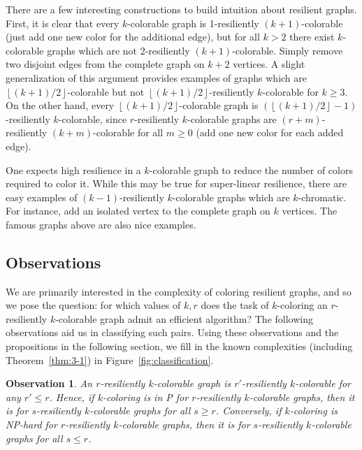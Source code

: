 \documentclass{llncs}
\newtheorem{obs}{Observation}
\begin{document}

There are a few interesting constructions to build intuition about resilient
graphs. First, it is clear that every $k$-colorable graph is 1-resiliently
$(k+1)$-colorable (just add one new color for the additional edge), but for all
$k > 2$ there exist $k$-colorable graphs which are not 2-resiliently
$(k+1)$-colorable. Simply remove two disjoint edges from the complete graph on
$k+2$ vertices. A slight generalization of this argument provides examples of
graphs which are $\left \lfloor (k+1)/2\right \rfloor$-colorable but not $\left
\lfloor (k+1)/2 \right \rfloor$-resiliently $k$-colorable for $k \geq 3$.
On the other hand, every $\left \lfloor (k+1)/2\right \rfloor$-colorable graph
is $(\left \lfloor (k+1)/2 \right \rfloor-1)$-resiliently $k$-colorable, since
$r$-resiliently $k$-colorable graphs are $(r+m)$-resiliently $(k+m)$-colorable
for all $m \geq 0$ (add one new color for each added edge). 

One expects high resilience in a $k$-colorable graph to reduce the number of
colors required to color it. While this may be true for super-linear
resilience, there are easy examples of $(k-1)$-resiliently $k$-colorable graphs
which are $k$-chromatic. For instance, add an isolated vertex to the complete
graph on $k$ vertices. The famous graphs above are also nice examples.

\subsection{Observations}

We are primarily interested in the complexity of coloring resilient graphs, and
so we pose the question: for which values of $k,r$ does the task of
$k$-coloring an $r$-resiliently $k$-colorable graph admit an efficient
algorithm? The following observations aid us in classifying such pairs. Using
these observations and the propositions in the following section, we fill in
the known complexities (including Theorem~\ref{thm:3-1}) in
Figure~\ref{fig:classification}.

\begin{obs}\label{obs:horizontal}
An $r$-resiliently $k$-colorable graph is $r'$-resiliently $k$-colorable for
any $r' \leq r$. Hence, if $k$-coloring is in P for $r$-resiliently
$k$-colorable graphs, then it is for $s$-resiliently $k$-colorable graphs for
all $s \geq r$.  Conversely, if $k$-coloring is NP-hard for $r$-resiliently
$k$-colorable graphs, then it is for $s$-resiliently $k$-colorable graphs for
all $s \leq r$. 
\end{obs}
\end{document}
